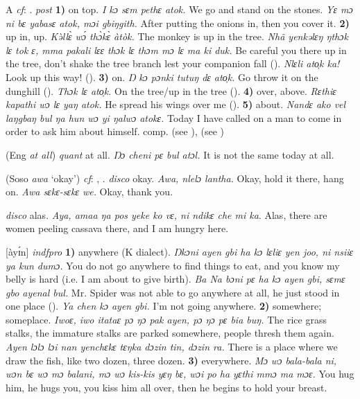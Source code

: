 \begin{letter}{A}
 \textit{cf}: . \textit{post} \textbf{1)} on top. \textit{I kɔ sɛm pethɛ atok.} We go and stand on the stones. \textit{Yɛ mɔ ni bɛ yabasɛ atok, mɔi gbiŋgith.} After putting the onions in, then you cover it. \textbf{2)} up in, up. \textit{Kə̀llɛ̀ wɔ́ thɔ̀kɛ̀ àtòk.} The monkey is up in the tree. \textit{Nhã yenkəlɛŋ ŋthɔk lɛ tok ɛ, mma pakali lɛɛ thɔk lɛ thɔm mɔ lɛ ma ki duk.} Be careful you there up in the tree, don't shake the tree branch lest your companion fall (\citealt{Pichl1967}). \textit{Nlɛli ato̹k ka!} Look up this way! (\citealt{Pichl1967}). \textbf{3)} on. \textit{Ŋ kɔ pɔnki tutuŋ dɛ ato̹k.} Go throw it on the dunghill (\citealt{Pichl1967}). \textit{Thɔk lɛ ato̹k.} On the tree/up in the tree (\citealt{Pichl1967}). \textbf{4)} over, above. \textit{Rɛthiɛ kapathi wɔ lɛ yaŋ atok.} He spread his wings over me (\citealt{Pichl1967}). \textbf{5)} about. \textit{Nandɛ ako vel laŋgbaŋ bul ŋa hun wɔ yi ŋalwɔ atokɛ.} Today I have called on a man to come in order to ask him about himself. comp.  (see ),  (see ) 

 (Eng \textit{at all}) \textit{quant} at all. \textit{Ŋɔ cheni pɛ bul atɔl.} It is not the same today at all.

 (Soso \textit{awa} ‘okay') \textit{cf}: , . \textit{disco} okay. \textit{Awa, nlelɔ lantha.} Okay, hold it there, hang on. \textit{Awa sɛkɛ-sɛkɛ we.} Okay, thank you.

 \textit{disco} alas. \textit{Aya, amaa ŋa pos yeke ko vɛ, ni ndikɛ che mi ka}. Alas, there are women peeling cassava there, and I am hungry here.

 [àyɪ́n] \textit{indfpro} \textbf{1)} anywhere (K dialect). \textit{Ŋkɔni ayen gbi ha kɔ lɛliɛ yen joo, ni nsiiɛ ya kun dumɔ.} You do not go anywhere to find things to eat, and you know my belly is hard (i.e. I am about to give birth). \textit{Ba Na bɔni pɛ ha kɔ ayen gbi, sɛmɛ gbo ayenal bul.} Mr. Spider was not able to go anywhere at all, he just stood in one place (\citealt{Sumner1921}). \textit{Ya chen kɔ ayen gbi.} I'm not going anywhere. \textbf{2)} somewhere; someplace. \textit{Iwoɛ, iwo itataɛ pɔ ŋɔ pak ayen, pɔ ŋɔ pɛ bia buŋ.} The rice grass stalks, the immature stalks are parked somewhere, people thresh them again. \textit{Ayen lɔlɔ lɔi nan yenchɛkɛ tɛŋka dɔzin tin, dɔzin ra.} There is a place where we draw the fish, like two dozen, three dozen. \textbf{3)} everywhere. \textit{Mɔ wɔ bala-bala ni, wɔn bɛ wɔ mɔ balani, mɔ wɔ kis-kis yɛŋ bɛ, wɔi po ha yɛthi mmɔ ma mɔɛ.} You hug him, he hugs you, you kiss him all over, then he begins to hold your breast.


\end{letter}
